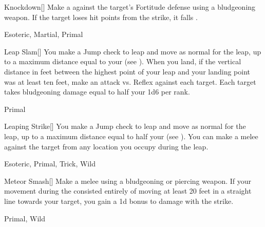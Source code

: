 \lowercase{\hypertarget{maneuver:Knockdown}{}}\label{maneuver:Knockdown}
\hypertarget{maneuver:Knockdown}{}
\begin{freeability}[Rank 3]{Knockdown}[]
Make a  against the target's Fortitude defense using a bludgeoning weapon.
If the target loses hit points from the strike, it falls .


 Esoteric, Martial, Primal
\end{freeability}
\vspace{0.25em}



\lowercase{\hypertarget{maneuver:Leap Slam}{}}\label{maneuver:Leap Slam}
\hypertarget{maneuver:Leap Slam}{}
\begin{freeability}[Rank 3]{Leap Slam}[]
You make a Jump check to leap and move as normal for the leap, up to a maximum distance equal to your  (see ).
When you land, if the vertical distance in feet between the highest point of your leap and your landing point was at least ten feet, make an attack vs. Reflex against each target.
\hit Each target takes bludgeoning damage equal to half your  \add 1d6 per rank.


 Primal
\end{freeability}
\vspace{0.25em}



\lowercase{\hypertarget{maneuver:Leaping Strike}{}}\label{maneuver:Leaping Strike}
\hypertarget{maneuver:Leaping Strike}{}
\begin{freeability}[Rank 3]{Leaping Strike}[]
You make a Jump check to leap and move as normal for the leap, up to a maximum distance equal to half your  (see ).
You can make a melee  against the target from any location you occupy during the leap.


 Esoteric, Primal, Trick, Wild
\end{freeability}
\vspace{0.25em}



\lowercase{\hypertarget{maneuver:Meteor Smash}{}}\label{maneuver:Meteor Smash}
\hypertarget{maneuver:Meteor Smash}{}
\begin{freeability}[Rank 3]{Meteor Smash}[]
Make a melee  using a bludgeoning or piercing weapon.
If your movement during the  consisted entirely of moving at least 20 feet in a straight line towards your target, you gain a \plus1d bonus to damage with the strike.


 Primal, Wild
\end{freeability}
\vspace{0.25em}



